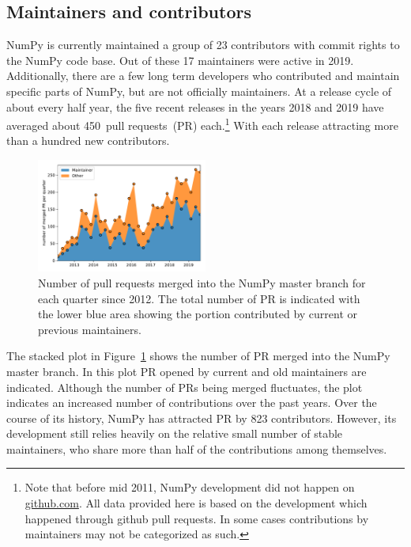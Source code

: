 \documentclass[fleqn,10pt]{wlscirep}
\begin{document}

\subsection*{Maintainers and contributors}


NumPy is currently maintained a group of 23 contributors with commit rights
to the NumPy code base. Out of these 17 maintainers were active in 2019.
Additionally, there are a few long term developers who contributed and maintain
specific parts of NumPy, but are not officially maintainers.
At a release cycle of about every half year, the five recent releases in the years
2018 and 2019 have averaged about 450~pull requests~(PR) each.\footnote{
    Note that before mid 2011, NumPy development did not happen on \url{github.com}.
    All data provided here is based on the development which happened through github
    pull requests. In some cases contributions by maintainers may not be categorized as such.}
With each release attracting more than a hundred new contributors.

\begin{figure}
    \centering
    \includegraphics[width=0.5\textwidth]{scripts/PRs-using-CURRENT_MAINTAINERS.pdf}
    \caption{Number of pull requests merged into the NumPy master branch for each
        quarter since 2012. The total number of PR is indicated with the
        lower blue area showing the portion contributed by current or previous
        maintainers.}\label{fig:prs-over-time}
\end{figure}

The stacked plot in Figure~\ref{fig:prs-over-time} shows the number of
PR merged into the NumPy master branch.
In this plot PR opened by current and old maintainers are indicated.
Although the number of PRs being merged fluctuates,
the plot indicates an increased number of contributions over the past
years.
Over the course of its history, NumPy has attracted PR by 823 contributors.
However, its development still relies heavily on the relative small number
of stable maintainers, who share more than half of the contributions among
themselves.
\end{document}
